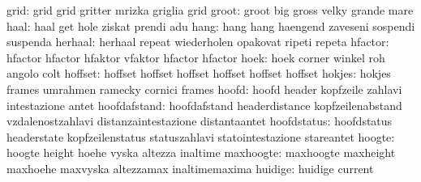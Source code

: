                     grid: grid                      grid
                           gritter                   mrizka
                           griglia                   grid
                    groot: groot                     big
                           gross                     velky
                           grande                    mare
                     haal: haal                      get
                           hole                      ziskat
                           prendi                    adu
                     hang: hang                      hang
                           haengend                  zaveseni
                           sospendi                  suspenda
                  herhaal: herhaal                   repeat
                           wiederholen               opakovat
                           ripeti                    repeta
                  hfactor: hfactor                   hfactor
                           hfaktor                   vfaktor
                           hfactor                   hfactor  %
                     hoek: hoek                      corner
                           winkel                    roh
                           angolo                    colt
                  hoffset: hoffset                   hoffset
                           hoffset                   hoffset
                           hoffset                   hoffset %
                   hokjes: hokjes                    frames
                           umrahmen                  ramecky
                           cornici                   frames
                    hoofd: hoofd                     header
                           kopfzeile                 zahlavi
                           intestazione              antet
             hoofdafstand: hoofdafstand              headerdistance
                           kopfzeilenabstand         vzdalenostzahlavi
                           distanzaintestazione      distantaantet
              hoofdstatus: hoofdstatus               headerstate
                           kopfzeilenstatus          statuszahlavi
                           statointestazione         stareantet
                   hoogte: hoogte                    height
                           hoehe                     vyska
                           altezza                   inaltime
                maxhoogte: maxhoogte                 maxheight
                           maxhoehe                  maxvyska
                           altezzamax                inaltimemaxima
                  huidige: huidige                   current
